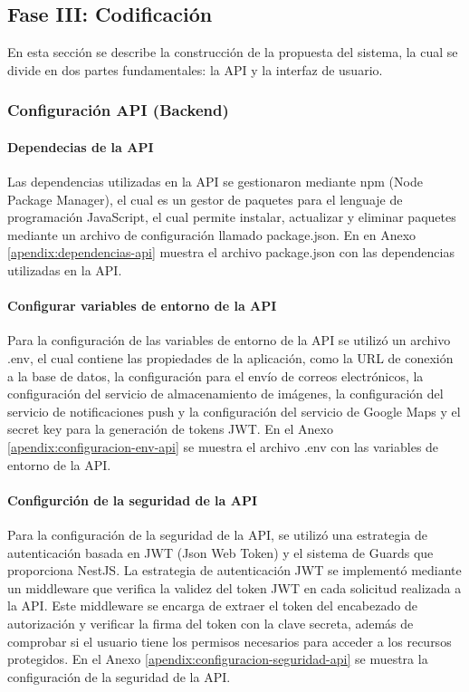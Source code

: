 \subsection{Fase III: Codificación}

En esta sección se describe la construcción de la propuesta del sistema, la cual se divide en dos partes fundamentales: la API y la interfaz
de usuario.

\subsubsection{Configuración API (Backend)}

\paragraph{Dependecias de la API}
Las dependencias utilizadas en la API se gestionaron mediante npm (Node Package Manager), el cual es un gestor de paquetes para el lenguaje
de programación JavaScript, el cual permite instalar, actualizar y eliminar paquetes mediante un archivo de configuración llamado package.json.
En en Anexo \ref{apendix:dependencias-api} muestra el archivo package.json con las dependencias utilizadas en la API.

\paragraph{Configurar variables de entorno de la API}
Para la configuración de las variables de entorno de la API se utilizó un archivo .env, el cual contiene las propiedades de la
aplicación, como la URL de conexión a la base de datos, la configuración para el envío de correos electrónicos, la configuración del servicio de
almacenamiento de imágenes, la configuración del servicio de notificaciones push y la configuración del servicio de Google Maps y el secret key
para la generación de tokens JWT. En el Anexo \ref{apendix:configuracion-env-api} se muestra el archivo .env con las variables de entorno de la API.

\paragraph{Configurción de la seguridad de la API}
Para la configuración de la seguridad de la API, se utilizó una estrategia de autenticación basada en JWT (Json Web Token) y el sistema
de Guards que proporciona NestJS. La estrategia de autenticación JWT se implementó mediante un middleware que verifica la validez del
token JWT en cada solicitud realizada a la API. Este middleware se encarga de extraer el token del encabezado de autorización y verificar
la firma del token con la clave secreta, además de comprobar si el usuario tiene los permisos necesarios para acceder a los recursos
protegidos. En el Anexo \ref{apendix:configuracion-seguridad-api} se muestra la configuración de la seguridad de la API.

